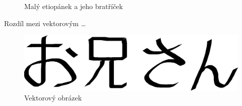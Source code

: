 \documentclass[11pt,a4paper]{article}
\begin{document}
\begin{figure}[htb]
 		\caption{Malý etiopánek a jeho bratříček}
 		\label{Picture1}
\end{figure}

\newpage

Rozdíl mezi vektorovým \dots


\begin{figure}[htb]
 	\centering
 		\includegraphics[scale=0.43]{oniisan.eps}
 		\caption{Vektorový obrázek}
 		\label{Picture2}
\end{figure}
\end{document}
